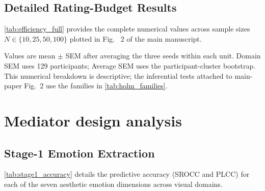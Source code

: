 \documentclass[10pt,twocolumn,letterpaper]{article}
\begin{document}
\subsection{Detailed Rating-Budget Results}
\cref{tab:efficiency_full} provides the complete numerical values across sample sizes $N \in \{10, 25, 50, 100\}$ plotted in Fig. ~2 of the main manuscript.

\begin{table}[!tbp]
\centering
\begin{threeparttable}
\caption{Population, Direct, and Hybrid performance across personal-rating
budgets with Qwen3-VL 8B and the population anchor.}
\label{tab:efficiency_full}
\fontsize{6.1}{7.2}\selectfont
\setlength{\tabcolsep}{1.2pt}
    
\begin{tablenotes}[flushleft]\footnotesize
    \item Values are mean $\pm$ SEM after averaging the three seeds within each unit. Domain SEM uses 129 participants; Average SEM uses the participant-cluster bootstrap. This numerical breakdown is descriptive; the inferential tests attached to main-paper Fig.~2 use the families in
\cref{tab:holm_families}.
\end{tablenotes}
\end{threeparttable}
\end{table}

\section{Mediator design analysis}
\label{sec:supp_mediator}
\subsection{Stage-1 Emotion Extraction}
\cref{tab:stage1_accuracy} details the predictive accuracy (SROCC and PLCC) for each of the seven aesthetic emotion dimensions across visual domains.
\end{document}
